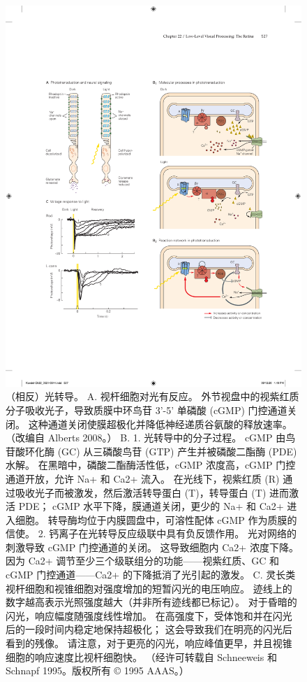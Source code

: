 \begin{figure}[htbp]
	\centering
	\includegraphics[width=1.0\linewidth]{chap22/fig_22_7}
	\caption{（相反）光转导。
		A. 视杆细胞对光有反应。
		外节视盘中的视紫红质分子吸收光子，导致质膜中环鸟苷 3'-5' 单磷酸 (cGMP) 门控通道关闭。
		这种通道关闭使膜超极化并降低神经递质谷氨酸的释放速率。 （改编自 Alberts 2008。）
		B. 1. 光转导中的分子过程。 cGMP 由鸟苷酸环化酶 (GC) 从三磷酸鸟苷 (GTP) 产生并被磷酸二酯酶 (PDE) 水解。
		在黑暗中，磷酸二酯酶活性低，cGMP 浓度高，cGMP 门控通道开放，允许 Na+ 和 Ca2+ 流入。 在光线下，视紫红质 (R) 通过吸收光子而被激发，然后激活转导蛋白 (T)，转导蛋白 (T) 进而激活 PDE； cGMP 水平下降，膜通道关闭，更少的 Na+ 和 Ca2+ 进入细胞。 转导酶均位于内膜圆盘中，可溶性配体 cGMP 作为质膜的信使。 
		2. 钙离子在光转导反应级联中具有负反馈作用。 光对网络的刺激导致 cGMP 门控通道的关闭。 这导致细胞内 Ca2+ 浓度下降。 因为 Ca2+ 调节至少三个级联组分的功能——视紫红质、GC 和 cGMP 门控通道——Ca2+ 的下降抵消了光引起的激发。 
		C. 灵长类视杆细胞和视锥细胞对强度增加的短暂闪光的电压响应。 
		迹线上的数字越高表示光照强度越大（并非所有迹线都已标记）。 
		对于昏暗的闪光，响应幅度随强度线性增加。 
		在高强度下，受体饱和并在闪光后的一段时间内稳定地保持超极化； 
		这会导致我们在明亮的闪光后看到的残像。 
		请注意，对于更亮的闪光，响应峰值更早，并且视锥细胞的响应速度比视杆细胞快。 （经许可转载自 Schneeweis 和 Schnapf 1995。版权所有 © 1995 AAAS。）}
	\label{fig:22_7}
\end{figure}



